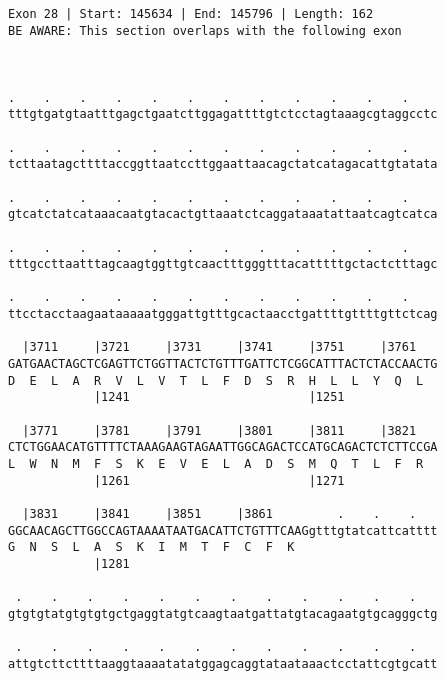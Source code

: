 \documentclass{article}
\begin{document}
\begin{Verbatim}
                                
 
Exon 28 | Start: 145634 | End: 145796 | Length: 162
BE AWARE: This section overlaps with the following exon



.    .    .    .    .    .    .    .    .    .    .    .    
tttgtgatgtaatttgagctgaatcttggagattttgtctcctagtaaagcgtaggcctc
                                                            
.    .    .    .    .    .    .    .    .    .    .    .    
tcttaatagcttttaccggttaatccttggaattaacagctatcatagacattgtatata
                                                            
.    .    .    .    .    .    .    .    .    .    .    .    
gtcatctatcataaacaatgtacactgttaaatctcaggataaatattaatcagtcatca
                                                            
.    .    .    .    .    .    .    .    .    .    .    .    
tttgccttaatttagcaagtggttgtcaactttgggtttacatttttgctactctttagc
                                                            
.    .    .    .    .    .    .    .    .    .    .    .    
ttcctacctaagaataaaaatgggattgtttgcactaacctgattttgttttgttctcag
                                                            
  |3711     |3721     |3731     |3741     |3751     |3761   
GATGAACTAGCTCGAGTTCTGGTTACTCTGTTTGATTCTCGGCATTTACTCTACCAACTG
D  E  L  A  R  V  L  V  T  L  F  D  S  R  H  L  L  Y  Q  L  
            |1241                         |1251             
  
  |3771     |3781     |3791     |3801     |3811     |3821   
CTCTGGAACATGTTTTCTAAAGAAGTAGAATTGGCAGACTCCATGCAGACTCTCTTCCGA
L  W  N  M  F  S  K  E  V  E  L  A  D  S  M  Q  T  L  F  R  
            |1261                         |1271             
  
  |3831     |3841     |3851     |3861         .    .    .   
GGCAACAGCTTGGCCAGTAAAATAATGACATTCTGTTTCAAGgtttgtatcattcatttt
G  N  S  L  A  S  K  I  M  T  F  C  F  K                    
            |1281                                           
  
 .    .    .    .    .    .    .    .    .    .    .    .   
gtgtgtatgtgtgtgctgaggtatgtcaagtaatgattatgtacagaatgtgcagggctg
                                                            
 .    .    .    .    .    .    .    .    .    .    .    .   
attgtcttcttttaaggtaaaatatatggagcaggtataataaactcctattcgtgcatt
                                                            

\end{Verbatim}
\end{document}
